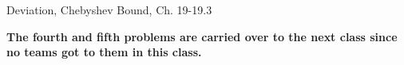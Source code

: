 \documentclass[handout]{mcs}
\begin{document}

\begin{staffnotes}
Deviation, Chebyshev Bound, Ch. 19-19.3
\end{staffnotes}


\textbf{
The fourth and fifth problems are carried over to the next class since
no teams got to them in this class.
}

\iffalse

\pinput{FP_coloring_complete_triangles}



\begin{center}
\textbf{Supplementary Problem}
\end{center}

\pinput{CP_chebyshev_tight}
\fi




\end{document}
